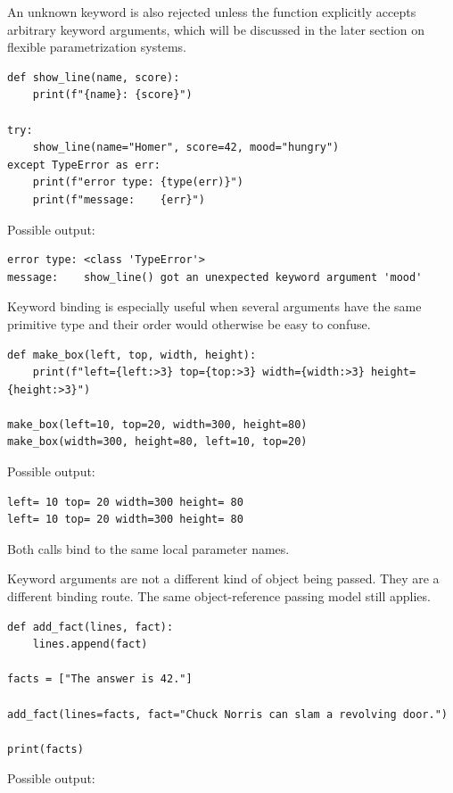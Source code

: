 An unknown keyword is also rejected unless the function explicitly accepts arbitrary keyword arguments, which will be discussed in the later section on flexible parametrization systems.

\begin{verbatim}
def show_line(name, score):
    print(f"{name}: {score}")

try:
    show_line(name="Homer", score=42, mood="hungry")
except TypeError as err:
    print(f"error type: {type(err)}")
    print(f"message:    {err}")
\end{verbatim}

Possible output:

\begin{verbatim}
error type: <class 'TypeError'>
message:    show_line() got an unexpected keyword argument 'mood'
\end{verbatim}

Keyword binding is especially useful when several arguments have the same primitive type and their order would otherwise be easy to confuse.

\begin{verbatim}
def make_box(left, top, width, height):
    print(f"left={left:>3} top={top:>3} width={width:>3} height={height:>3}")

make_box(left=10, top=20, width=300, height=80)
make_box(width=300, height=80, left=10, top=20)
\end{verbatim}

Possible output:

\begin{verbatim}
left= 10 top= 20 width=300 height= 80
left= 10 top= 20 width=300 height= 80
\end{verbatim}

Both calls bind to the same local parameter names.

Keyword arguments are not a different kind of object being passed. They are a different binding route. The same object-reference passing model still applies.

\begin{verbatim}
def add_fact(lines, fact):
    lines.append(fact)

facts = ["The answer is 42."]

add_fact(lines=facts, fact="Chuck Norris can slam a revolving door.")

print(facts)
\end{verbatim}

Possible output:

